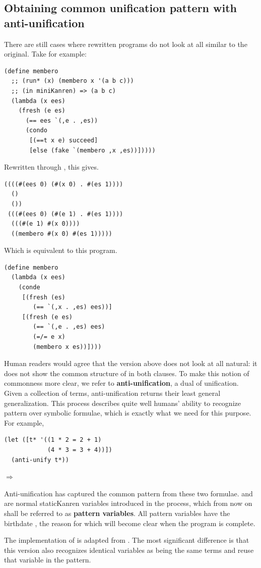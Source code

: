 \subsection{Obtaining common unification pattern with anti-unification}\label{au}
There are still cases where rewritten programs do not look at all similar to the original. Take  for example:
\begin{lstlisting}
(define membero
  ;; (run* (x) (membero x '(a b c)))
  ;; (in miniKanren) => (a b c)
  (lambda (x ees)
    (fresh (e es)
      (== ees `(,e . ,es))
      (condo
       [(==t x e) succeed]
       [else (fake `(membero ,x ,es))]))))
\end{lstlisting}

Rewritten through , this gives.
\begin{lstlisting}
((((#(ees 0) (#(x 0) . #(es 1)))) 
  ()
  ())
 (((#(ees 0) (#(e 1) . #(es 1))))
  (((#(e 1) #(x 0))))
  ((membero #(x 0) #(es 1)))))
\end{lstlisting}
Which is equivalent to this program.
\begin{lstlisting}
(define membero
  (lambda (x ees)
    (conde
     [(fresh (es)
        (== `(,x . ,es) ees))]
     [(fresh (e es)
        (== `(,e . ,es) ees)
        (=/= e x)
        (membero x es))])))
\end{lstlisting}
Human readers would agree that the version above does not look at all natural: it does not show the common structure of  in both clauses. To make this notion of commonness more clear, we refer to \textbf{anti-unification}, a dual of unification. Given a collection of terms, anti-unification returns their least general generalization. This process describes quite well humans' ability to recognize pattern over symbolic formulae, which is exactly what we need for this purpose. For example,
\begin{lstlisting}
(let ([t* '((1 * 2 = 2 + 1)
            (4 * 3 = 3 + 4))])
  (anti-unify t*))
\end{lstlisting}
$\Rightarrow$ 

Anti-unification has captured the common pattern from these two formulae.  and  are normal staticKanren variables introduced in the process, which from now on shall be referred to as \textbf{pattern variables}. All pattern variables have the birthdate , the reason for which will become clear when the program is complete.

The implementation of  is adapted from \textcite{ostvold2004functional}. The most significant difference is that this version also recognizes identical variables as being the same terms and reuse that variable in the pattern. 

